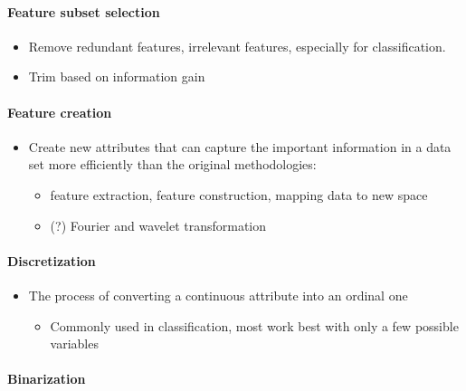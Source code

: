 \documentclass[11pt]{article}
\providecommand{\tightlist}{%
      \setlength{\itemsep}{0pt}\setlength{\parskip}{0pt}}
\begin{document}
    \paragraph{Feature subset selection}\label{feature-subset-selection}

    \begin{itemize}
\tightlist
\item
  Remove redundant features, irrelevant features, especially for
  classification.
\item
  Trim based on information gain
\end{itemize}

    \paragraph{Feature creation}\label{feature-creation}

    \begin{itemize}
\tightlist
\item
  Create new attributes that can capture the important information in a
  data set more efficiently than the original methodologies:

  \begin{itemize}
  \tightlist
  \item
    feature extraction, feature construction, mapping data to new space
  \item
    (?) Fourier and wavelet transformation
  \end{itemize}
\end{itemize}

    \paragraph{Discretization}\label{discretization}

    \begin{itemize}
\tightlist
\item
  The process of converting a continuous attribute into an ordinal one

  \begin{itemize}
  \tightlist
  \item
    Commonly used in classification, most work best with only a few
    possible variables
  \end{itemize}
\end{itemize}

    \paragraph{Binarization}\label{binarization}
\end{document}
